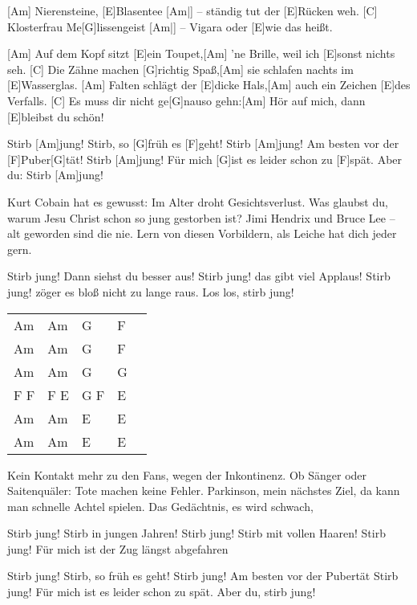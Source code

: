 

\begin{guitar}
	[Am] Nierensteine, [E]Blasentee [Am|]{ – }ständig tut der [E]Rücken weh.
	[C] Klosterfrau Me[G]lissengeist [Am|]{ – }Vigara oder [E]wie das heißt.
	
	[Am] Auf dem Kopf sitzt [E]ein Toupet,[Am] 'ne Brille, weil ich [E]sonst nichts seh.
	[C] Die Zähne machen [G]richtig Spaß,[Am] sie schlafen nachts im [E]Wasserglas.
	[Am] Falten schlägt der [E]dicke Hals,[Am] auch ein Zeichen [E]des Verfalls.
	[C] Es muss dir nicht ge[G]nauso gehn:[Am] Hör auf mich, dann [E]bleibst du schön!
	
	Stirb [Am]jung! Stirb, so [G]früh es [F]geht! 	Stirb [Am]jung! Am besten vor der [F]Puber[G]tät!
	Stirb [Am]jung! Für mich [G]ist es leider schon zu [F]spät. Aber du: Stirb [Am]jung!
	
	Kurt Cobain hat es gewusst: Im Alter droht Gesichtsverlust.
	Was glaubst du, warum Jesu Christ schon so jung gestorben ist?
	Jimi Hendrix und Bruce Lee – alt geworden sind die nie.
	Lern von diesen Vorbildern, als Leiche hat dich jeder gern.
	
	Stirb jung! Dann siehst du besser aus! Stirb jung! das gibt viel Applaus!
	Stirb jung! zöger es bloß nicht zu lange raus. Los los, stirb jung!
	
	{\footnotesize\begin{tabular}{l|l|l|l l}
			Am & Am & G & F & \\
			Am & Am & G & F & \\
			Am & Am & G & G & \\
			F F & F E & G F & E & \vspace{0.5em}\\
			Am & Am & E & E & \\
			Am & Am & E & E &
	\end{tabular}}
	
	Kein Kontakt mehr zu den Fans, wegen der Inkontinenz.
	Ob Sänger oder Saitenquäler: Tote machen keine Fehler.
	Parkinson, mein nächstes Ziel, da kann man schnelle Achtel spielen.
	Das Gedächtnis, es wird schwach, 
	
	Stirb jung! Stirb in jungen Jahren! Stirb jung! Stirb mit vollen Haaren!
	Stirb jung! Für mich ist der Zug längst abgefahren
	
	Stirb jung! Stirb, so früh es geht! Stirb jung! Am besten vor der Pubertät
	Stirb jung! Für mich ist es leider schon zu spät. Aber du, stirb jung!
	
\end{guitar}